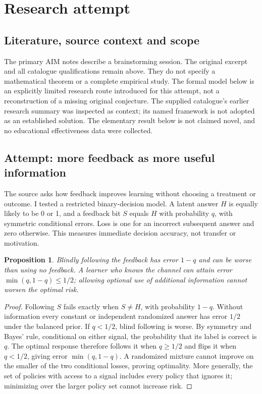 \documentclass[11pt]{article}
\newtheorem{proposition}{Proposition}
\begin{document}
\section{Research attempt}
\subsection{Literature, source context and scope}
The primary AIM notes describe a brainstorming session. The original excerpt and all catalogue qualifications remain above. They do not specify a mathematical theorem or a complete empirical study. The formal model below is an explicitly limited research route introduced for this attempt, not a reconstruction of a missing original conjecture. The supplied catalogue's earlier research summary was inspected as context; its named framework is not adopted as an established solution. The elementary result below is not claimed novel, and no educational effectiveness data were collected.

\subsection{Attempt: more feedback as more useful information}
The source asks how feedback improves learning without choosing a treatment or outcome. I tested a restricted binary-decision model. A latent answer $H$ is equally likely to be 0 or 1, and a feedback bit $S$ equals $H$ with probability $q$, with symmetric conditional errors. Loss is one for an incorrect subsequent answer and zero otherwise. This measures immediate decision accuracy, not transfer or motivation.
\begin{proposition}
Blindly following the feedback has error $1-q$ and can be worse than using no feedback. A learner who knows the channel can attain error $\min(q,1-q)\le1/2$; allowing optional use of additional information cannot worsen the optimal risk.
\end{proposition}
\begin{proof}
Following $S$ fails exactly when $S\ne H$, with probability $1-q$. Without information every constant or independent randomized answer has error $1/2$ under the balanced prior. If $q<1/2$, blind following is worse. By symmetry and Bayes' rule, conditional on either signal, the probability that its label is correct is $q$. The optimal response therefore follows it when $q\ge1/2$ and flips it when $q<1/2$, giving error $\min(q,1-q)$. A randomized mixture cannot improve on the smaller of the two conditional losses, proving optimality. More generally, the set of policies with access to a signal includes every policy that ignores it; minimizing over the larger policy set cannot increase risk.
\end{proof}
\end{document}
